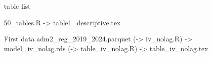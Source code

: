 table list

50_tables.R -> table1_descriptive.tex

First data
adm2_reg_2019_2024.parquet (-> iv_nolag.R) -> model_iv_nolag.rds (-> table_iv_nolag.R) -> table_iv_nolag.tex
